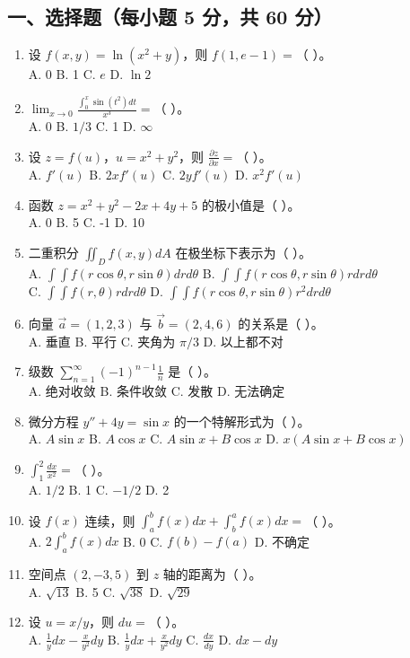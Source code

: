 \documentclass[11pt,a4paper]{article}
\begin{document}
\subsection*{一、选择题（每小题 5 分，共 60 分）}
\begin{enumerate}
    \item 设 $f(x,y) = \ln(x^2+y)$，则 $f(1, e-1) = $（ ）。 \\
    A. 0 \quad B. 1 \quad C. $e$ \quad D. $\ln 2$
    \item $\lim_{x \to 0} \frac{\int_0^x \sin(t^2) dt}{x^3} = $（ ）。 \\
    A. 0 \quad B. $1/3$ \quad C. 1 \quad D. $\infty$
    \item 设 $z = f(u)$，$u = x^2+y^2$，则 $\frac{\partial z}{\partial x} = $（ ）。 \\
    A. $f'(u)$ \quad B. $2x f'(u)$ \quad C. $2y f'(u)$ \quad D. $x^2 f'(u)$
    \item 函数 $z = x^2 + y^2 - 2x + 4y + 5$ 的极小值是（ ）。 \\
    A. 0 \quad B. 5 \quad C. -1 \quad D. 10
    \item 二重积分 $\iint_D f(x,y) dA$ 在极坐标下表示为（ ）。 \\
    A. $\int \int f(r\cos\theta, r\sin\theta) dr d\theta$ \quad B. $\int \int f(r\cos\theta, r\sin\theta) r dr d\theta$ \\
    C. $\int \int f(r, \theta) r dr d\theta$ \quad D. $\int \int f(r\cos\theta, r\sin\theta) r^2 dr d\theta$
    \item 向量 $\vec{a}=(1,2,3)$ 与 $\vec{b}=(2,4,6)$ 的关系是（ ）。 \\
    A. 垂直 \quad B. 平行 \quad C. 夹角为 $\pi/3$ \quad D. 以上都不对
    \item 级数 $\sum_{n=1}^{\infty} (-1)^{n-1} \frac{1}{n}$ 是（ ）。 \\
    A. 绝对收敛 \quad B. 条件收敛 \quad C. 发散 \quad D. 无法确定
    \item 微分方程 $y'' + 4y = \sin x$ 的一个特解形式为（ ）。 \\
    A. $A \sin x$ \quad B. $A \cos x$ \quad C. $A \sin x + B \cos x$ \quad D. $x(A \sin x + B \cos x)$
    \item $\int_1^2 \frac{dx}{x^2} = $（ ）。 \\
    A. $1/2$ \quad B. 1 \quad C. $-1/2$ \quad D. 2
    \item 设 $f(x)$ 连续，则 $\int_a^b f(x) dx + \int_b^a f(x) dx = $（ ）。 \\
    A. $2\int_a^b f(x) dx$ \quad B. 0 \quad C. $f(b)-f(a)$ \quad D. 不确定
    \item 空间点 $(2, -3, 5)$ 到 $z$ 轴的距离为（ ）。 \\
    A. $\sqrt{13}$ \quad B. 5 \quad C. $\sqrt{38}$ \quad D. $\sqrt{29}$
    \item 设 $u = x/y$，则 $du = $（ ）。 \\
    A. $\frac{1}{y} dx - \frac{x}{y^2} dy$ \quad B. $\frac{1}{y} dx + \frac{x}{y^2} dy$ \quad C. $\frac{dx}{dy}$ \quad D. $dx - dy$
\end{enumerate}
\end{document}

